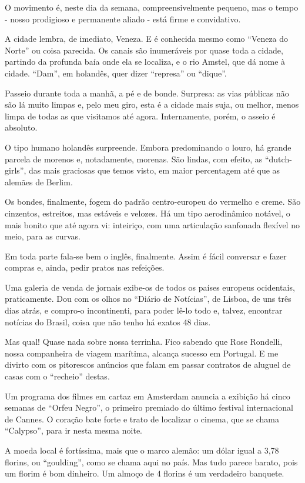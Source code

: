 O movimento é, neste dia da semana, compreensivelmente pequeno, mas o tempo - nosso prodigioso e permanente aliado - está firme e convidativo.

A cidade lembra, de imediato, Veneza. E é conhecida mesmo como “Veneza do Norte” ou coisa parecida. Os canais são inumeráveis por quase toda a cidade, partindo da profunda baía onde ela se localiza, e o rio Amstel, que dá nome à cidade. “Dam”, em holandês, quer dizer “represa” ou “dique”.

Passeio durante toda a manhã, a pé e de bonde. Surpresa: as vias públicas não são lá muito limpas e, pelo meu giro, esta é a cidade mais suja, ou melhor, menos limpa de todas as que visitamos até agora. Internamente, porém, o asseio é absoluto.

O tipo humano holandês surpreende. Embora predominando o louro, há grande parcela de morenos e, notadamente, morenas. São lindas, com efeito, as “dutch-girls”, das mais graciosas que temos visto, em maior percentagem até que as alemães de Berlim.

Os bondes, finalmente, fogem do padrão centro-europeu do vermelho e creme. São cinzentos, estreitos, mas estáveis e velozes. Há um tipo aerodinâmico notável, o mais bonito que até agora vi: inteiriço, com uma articulação sanfonada flexível no meio, para as curvas.

Em toda parte fala-se bem o inglês, finalmente. Assim é fácil conversar e fazer compras e, ainda, pedir pratos nas refeições.

Uma galeria de venda de jornais exibe-os de todos os países europeus ocidentais, praticamente. Dou com os olhos no “Diário de Notícias”, de Lisboa, de uns três dias atrás, e compro-o incontinenti, para poder lê-lo todo e, talvez, encontrar notícias do Brasil, coisa que não tenho há exatos 48 dias.

Mas qual! Quase nada sobre nossa terrinha. Fico sabendo que Rose Rondelli, nossa companheira de viagem marítima, alcança sucesso em Portugal. E me divirto com os pitorescos anúncios que falam em passar contratos de aluguel de casas com o “recheio” destas.

Um programa dos filmes em cartaz em Amsterdam anuncia a exibição há cinco semanas de “Orfeu Negro”, o primeiro premiado do último festival internacional de Cannes. O coração bate forte e trato de localizar o cinema, que se chama “Calypso”, para ir nesta mesma noite.

A moeda local é fortíssima, mais que o marco alemão: um dólar igual a 3,78 florins, ou “goulding”, como se chama aqui no país. Mas tudo parece barato, pois um florim é bom dinheiro. Um almoço de 4 florins é um verdadeiro banquete.

